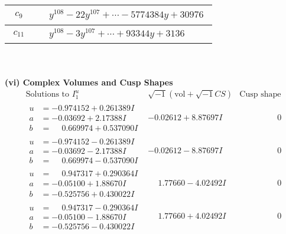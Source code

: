 \documentclass[1p]{elsarticle_modified}
\theoremstyle{definition}
\newcommand{\I}{\sqrt{-1}}
\begin{document}
\begin{tabular}{m{50pt}|m{274pt}}
\hline $$\begin{aligned}c_{9}\end{aligned}$$&$\begin{aligned}
&y^{108}-22 y^{107}+\cdots-5774384 y+30976
\end{aligned}$\\
\hline $$\begin{aligned}c_{11}\end{aligned}$$&$\begin{aligned}
&y^{108}-3 y^{107}+\cdots+93344 y+3136
\end{aligned}$\\
\hline
\end{tabular}\\~\\
\newpage\flushleft \textbf{(vi) Complex Volumes and Cusp Shapes}
$$\begin{array}{c|c|c}  
\text{Solutions to }I^u_{1}& \I (\text{vol} + \sqrt{-1}CS) & \text{Cusp shape}\\
 \hline 
\begin{aligned}
u &= -0.974152 + 0.261389 I \\
a &= -0.03692 + 2.17388 I \\
b &= \phantom{-}0.669974 + 0.537090 I\end{aligned}
 & -0.02612 + 8.87697 I & \phantom{-0.000000 } 0 \\ \hline\begin{aligned}
u &= -0.974152 - 0.261389 I \\
a &= -0.03692 - 2.17388 I \\
b &= \phantom{-}0.669974 - 0.537090 I\end{aligned}
 & -0.02612 - 8.87697 I & \phantom{-0.000000 } 0 \\ \hline\begin{aligned}
u &= \phantom{-}0.947317 + 0.290364 I \\
a &= -0.05100 + 1.88670 I \\
b &= -0.525756 + 0.430022 I\end{aligned}
 & \phantom{-}1.77660 - 4.02492 I & \phantom{-0.000000 } 0 \\ \hline\begin{aligned}
u &= \phantom{-}0.947317 - 0.290364 I \\
a &= -0.05100 - 1.88670 I \\
b &= -0.525756 - 0.430022 I\end{aligned}
 & \phantom{-}1.77660 + 4.02492 I & \phantom{-0.000000 } 0 \\ \hline\begin{aligned}

\end{aligned}
\end{array}$$
\end{document}
